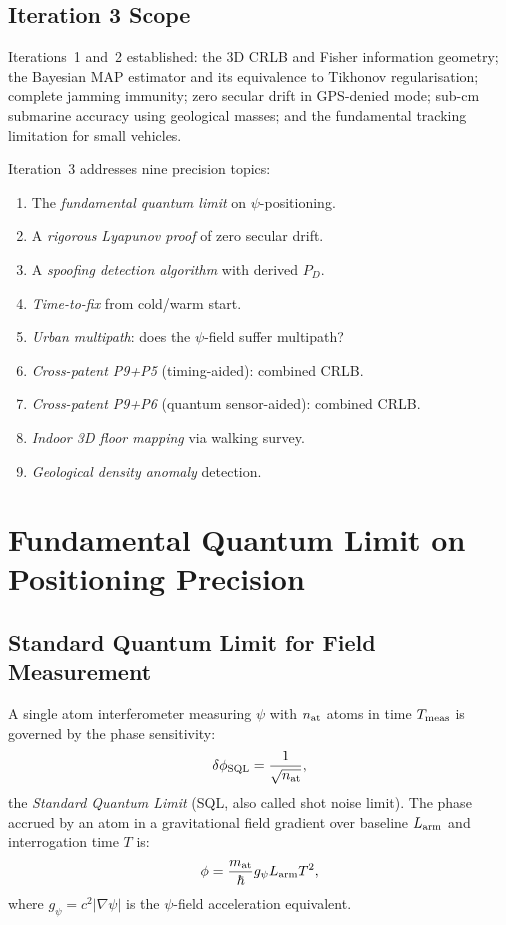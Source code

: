 \documentclass[aps,prd,twocolumn,superscriptaddress,nofootinbib]{revtex4-2}
\begin{document}
\subsection{Iteration 3 Scope}

Iterations~1 and~2 established: the 3D CRLB and Fisher information
geometry; the Bayesian MAP estimator and its equivalence to Tikhonov
regularisation; complete jamming immunity; zero secular drift in
GPS-denied mode; sub-cm submarine accuracy using geological masses;
and the fundamental tracking limitation for small vehicles.

Iteration~3 addresses nine precision topics:
\begin{enumerate}
  \item The \emph{fundamental quantum limit} on $\psi$-positioning.
  \item A \emph{rigorous Lyapunov proof} of zero secular drift.
  \item A \emph{spoofing detection algorithm} with derived $P_D$.
  \item \emph{Time-to-fix} from cold/warm start.
  \item \emph{Urban multipath}: does the $\psi$-field suffer multipath?
  \item \emph{Cross-patent P9+P5} (timing-aided): combined CRLB.
  \item \emph{Cross-patent P9+P6} (quantum sensor-aided): combined CRLB.
  \item \emph{Indoor 3D floor mapping} via walking survey.
  \item \emph{Geological density anomaly} detection.
\end{enumerate}

\section{Fundamental Quantum Limit on Positioning Precision}
\label{sec:quantum}

\subsection{Standard Quantum Limit for Field Measurement}

A single atom interferometer measuring $\psi$ with $n_{\rm at}$ atoms
in time $T_{\rm meas}$ is governed by the phase sensitivity:
\begin{equation}
  \delta\phi_{\rm SQL} = \frac{1}{\sqrt{n_{\rm at}}},
  \label{eq:sql-phase}
\end{equation}
the \emph{Standard Quantum Limit} (SQL, also called shot noise limit).
The phase accrued by an atom in a gravitational field gradient over
baseline $L_{\rm arm}$ and interrogation time $T$ is:
\begin{equation}
  \phi = \frac{m_{\rm at}}{\hbar} g_{\psi} L_{\rm arm} T^2,
  \label{eq:ai-phase}
\end{equation}
where $g_\psi = c^2 |\nabla\psi|$ is the $\psi$-field acceleration
equivalent.
\end{document}

